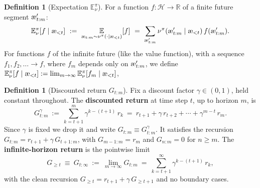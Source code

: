 \documentclass[fontsize=11pt, parskip=half]{scrartcl}
\theoremstyle{definition}
\newtheorem{definition}[theorem]{Definition}
\newcommand{\cH}{\mathcal{H}}
\newcommand{\Ex}{\mathbb{E}}
\newcommand{\aes}{\textnormal{\ae}}
\begin{document}
\begin{definition}[Expectation $\Ex_\nu^\pi$]\label{def:expectation}
For a function $f : \cH \to \mathbb{R}$ of a finite future segment $\aes'_{t:m}$:
\[
    \Ex_\nu^\pi[f \mid \aes_{<t}]
    ~:=~ \underset{\aes_{t:m} \sim \nu^\pi(\cdot \mid \aes_{<t})}{\Ex} [f]
    ~=~ \sum_{\aes'_{t:m}} \nu^\pi(\aes'_{t:m} \mid \aes_{<t})\, f(\aes'_{t:m}).
\]
For functions $f$ of the infinite future (like the value function), with a sequence $f_1, f_2, \ldots \to f$, where $f_m$ depends only on $\aes'_{t:m}$, we define $\Ex_\nu^\pi[f \mid \aes_{<t}] := \lim_{m \to \infty} \Ex_\nu^\pi[f_m \mid \aes_{<t}]$, 
\end{definition}

\begin{definition}[Discounted return $G_{t:m}$]\label{def:return}
Fix a discount factor $\gamma \in (0,1)$, held constant throughout.
The \textbf{discounted return} at time step $t$, up to horizon $m$, is
\[
    G^\gamma_{t:m}
    ~:=~ \sum_{k=t+1}^{m} \gamma^{k-(t+1)}\, r_k
    ~=~ r_{t+1} + \gamma\, r_{t+2} + \cdots + \gamma^{m-t}\, r_m.
\]
Since $\gamma$ is fixed we drop it and write $G_{t:m} \equiv G^\gamma_{t:m}$.
It satisfies the recursion $G_{t:m} = r_{t+1} + \gamma\, G_{t+1:m}$, with $G_{m-1:m} = r_m$ and $G_{n:m} = 0$ for $n \geq m$.
The \textbf{infinite-horizon return} is the pointwise limit
\[
    G_{\geq t} ~\equiv~ G_{t:\infty} ~:=~ \lim_{m \to \infty} G_{t:m} ~=~ \sum_{k=t+1}^{\infty} \gamma^{k-(t+1)}\, r_k,
\]
with the clean recursion $G_{\geq t} = r_{t+1} + \gamma\, G_{\geq t+1}$ and no boundary cases.
\end{definition}
\end{document}
